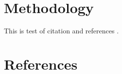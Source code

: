 \documentclass[a4paper, 12pt]{article}
\begin{document}
\section{Methodology}
This is test of citation and references \cite{test}.

\section{References}
\begin{refsection}
\nocite{*}
\printbibliography[heading=none]
\end{refsection}
\end{document}
